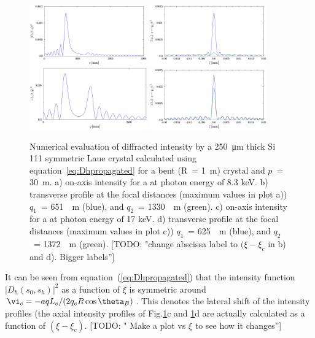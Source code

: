 \documentclass[preprint]{iucr}              %
\newcommand{\todo}[1]{{\color{red}[TODO: "#1'']}}
\begin{document}
\begin{figure}
\label{fig:8keV}
\caption{Numerical evaluation of diffracted intensity by a \SI{250}{\micro\meter} thick Si 111 symmetric Laue crystal calculated using equation~\ref{eq:Dhpropagated} for a bent (R~= \SI{1}{\meter}) crystal and $p$~= \SI{30}{\meter}. 
a) on-axis intensity for a at photon energy of 8.3 keV. 
b) transverse profile at the focal distances (maximum values in plot a)) 
$q_1$~= \SI{651}{\mili\meter} (blue), and
$q_2$~= \SI{1330}{\mili\meter} (green).
c) on-axis intensity for a at photon energy of 17 keV.
d) transverse profile at the focal distances (maximum values in plot c))
$q_1$~= \SI{625}{\mili\meter} (blue), and 
$q_2$~= \SI{1372}{\mili\meter} (green).
\todo{change abscissa label to $(\xi-\xi_c$ in b) and d). Bigger labels}
}
\includegraphics[width=0.45\textwidth]{bent1m8keV.eps}
\includegraphics[width=0.45\textwidth]{bent1m8keV_profile.eps}
\includegraphics[width=0.45\textwidth]{bent1m17keV.eps}
\includegraphics[width=0.45\textwidth]{bent1m17keV_profile.eps}
\end{figure}

It can be seen from equation~(\ref{eq:Dhpropagated}) that the intensity function $|D_h(s_0,s_h)|^2$ as a function of $\xi$ is symmetric around $\vi_c=-a q L_e / (2 q_e R \cos\theta_B)$. This denotes the lateral shift of the intensity profiles (the axial intensity profiles of Fig.\ref{fig:8keV}c and \ref{fig:8keV}d are actually calculated as a function of $(\xi-\xi_c)$. \todo{ Make a plot vs $\xi$ to see how it changes}
\end{document}
